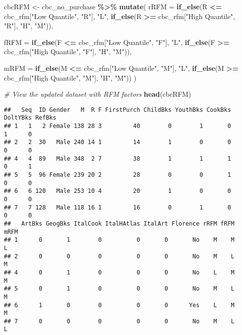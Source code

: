 \documentclass[
]{article}
\newenvironment{Shaded}{\begin{snugshade}}{\end{snugshade}}
\newcommand{\AttributeTok}[1]{\textcolor[rgb]{0.13,0.29,0.53}{#1}}
\newcommand{\CommentTok}[1]{\textcolor[rgb]{0.56,0.35,0.01}{\textit{#1}}}
\newcommand{\FunctionTok}[1]{\textcolor[rgb]{0.13,0.29,0.53}{\textbf{#1}}}
\newcommand{\NormalTok}[1]{#1}
\newcommand{\OtherTok}[1]{\textcolor[rgb]{0.56,0.35,0.01}{#1}}
\newcommand{\SpecialCharTok}[1]{\textcolor[rgb]{0.81,0.36,0.00}{\textbf{#1}}}
\newcommand{\StringTok}[1]{\textcolor[rgb]{0.31,0.60,0.02}{#1}}
\begin{document}
\begin{Shaded}
\begin{Highlighting}[]
\NormalTok{cbcRFM }\OtherTok{\textless{}{-}}\NormalTok{ cbc\_no\_purchase }\SpecialCharTok{\%\textgreater{}\%}
  \FunctionTok{mutate}\NormalTok{(}
    \AttributeTok{rRFM =} \FunctionTok{if\_else}\NormalTok{(R }\SpecialCharTok{\textless{}=}\NormalTok{ cbc\_rfm[}\StringTok{"Low Quantile"}\NormalTok{, }\StringTok{"R"}\NormalTok{], }\StringTok{"L"}\NormalTok{,}
                   \FunctionTok{if\_else}\NormalTok{(R }\SpecialCharTok{\textgreater{}=}\NormalTok{ cbc\_rfm[}\StringTok{"High Quantile"}\NormalTok{, }\StringTok{"R"}\NormalTok{], }\StringTok{"H"}\NormalTok{, }\StringTok{"M"}\NormalTok{)),}
    
    \AttributeTok{fRFM =} \FunctionTok{if\_else}\NormalTok{(F }\SpecialCharTok{\textless{}=}\NormalTok{ cbc\_rfm[}\StringTok{"Low Quantile"}\NormalTok{, }\StringTok{"F"}\NormalTok{], }\StringTok{"L"}\NormalTok{,}
                   \FunctionTok{if\_else}\NormalTok{(F }\SpecialCharTok{\textgreater{}=}\NormalTok{ cbc\_rfm[}\StringTok{"High Quantile"}\NormalTok{, }\StringTok{"F"}\NormalTok{], }\StringTok{"H"}\NormalTok{, }\StringTok{"M"}\NormalTok{)),}
    
    \AttributeTok{mRFM =} \FunctionTok{if\_else}\NormalTok{(M }\SpecialCharTok{\textless{}=}\NormalTok{ cbc\_rfm[}\StringTok{"Low Quantile"}\NormalTok{, }\StringTok{"M"}\NormalTok{], }\StringTok{"L"}\NormalTok{,}
                   \FunctionTok{if\_else}\NormalTok{(M }\SpecialCharTok{\textgreater{}=}\NormalTok{ cbc\_rfm[}\StringTok{"High Quantile"}\NormalTok{, }\StringTok{"M"}\NormalTok{], }\StringTok{"H"}\NormalTok{, }\StringTok{"M"}\NormalTok{))}
\NormalTok{  )}

\CommentTok{\# View the updated dataset with RFM factors}
\FunctionTok{head}\NormalTok{(cbcRFM)}
\end{Highlighting}
\end{Shaded}

\begin{verbatim}
##   Seq  ID Gender   M  R F FirstPurch ChildBks YouthBks CookBks DoltYBks RefBks
## 1   1   2 Female 138 28 3         40        0        1       0        1      0
## 2   2  30   Male 240 14 1         14        1        0       0        0      0
## 4   4  89   Male 348  2 7         38        1        1       1        0      1
## 5   5  96 Female 239 20 2         28        0        0       1        0      0
## 6   6 120   Male 253 10 4         20        1        0       0        0      0
## 7   7 128   Male 118 16 1         16        0        1       0        0      0
##   ArtBks GeogBks ItalCook ItalHAtlas ItalArt Florence rRFM fRFM mRFM
## 1      0       1        0          0       0       No    M    M    L
## 2      0       0        0          0       0       No    M    L    M
## 4      0       1        0          0       0       No    L    M    M
## 5      0       1        0          0       0       No    M    L    M
## 6      1       0        0          0       0      Yes    L    M    M
## 7      0       0        0          0       0       No    M    L    L
\end{verbatim}
\end{document}
